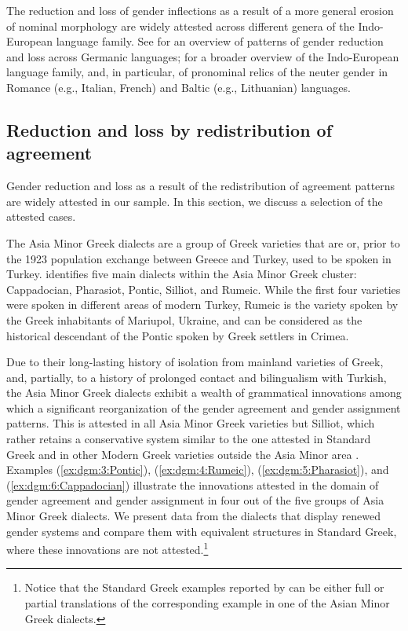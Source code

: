 \documentclass[output=collectionpaper]{langsci/langscibook}
\begin{document}
The reduction and loss of gender inflections as a result of a more general erosion of nominal morphology are widely attested across different genera of the Indo-European language family. See \citet[chapter 9]{Audring2009} for an overview of patterns of gender reduction and loss across Germanic languages; \citet{Priestly1983} for a broader overview of the Indo-European language family, and, in particular, of pronominal relics of the neuter gender in Romance (e.g., Italian, French) and Baltic (e.g., Lithuanian) languages.

\subsection{Reduction and loss by redistribution of agreement}
\label{subsubsec:semanticization}
Gender reduction and loss as a result of the redistribution of agreement patterns are widely attested in our sample. In this section, we discuss a selection of the attested cases.



The Asia Minor Greek dialects are a group of Greek varieties that are or, prior to the 1923 population exchange between Greece and Turkey, used to be spoken in Turkey. \citet{Karatsareas2014} identifies five main dialects within the Asia Minor Greek cluster:  Cappadocian, Pharasiot, Pontic, Silliot, and Rumeic. While the first four varieties were spoken in different areas of modern Turkey, Rumeic is the variety spoken by the Greek inhabitants of Mariupol, Ukraine, and can be considered as the historical descendant of the Pontic spoken by Greek settlers in Crimea.

Due to their long-lasting history of isolation from mainland varieties of Greek, and, partially, to a history of prolonged contact and bilingualism with Turkish, the Asia Minor Greek dialects exhibit a wealth of grammatical innovations among which a significant reorganization of the gender agreement and gender assignment patterns. This is attested in all Asia Minor Greek varieties but Silliot, which rather retains a conservative system similar to the one attested in Standard Greek and in other Modern Greek varieties outside the Asia Minor area \citep[83]{Karatsareas2014}. Examples (\ref{ex:dgm:3:Pontic}), (\ref{ex:dgm:4:Rumeic}), (\ref{ex:dgm:5:Pharasiot}), and (\ref{ex:dgm:6:Cappadocian}) illustrate the innovations attested in the domain of gender agreement and gender assignment in four out of the five groups of Asia Minor Greek dialects. We present data from the dialects that display renewed gender systems and compare them with equivalent structures in Standard Greek, where these innovations are not attested.\footnote{Notice that the Standard Greek examples reported by \citet{Karatsareas2014} can be either full or partial translations of the corresponding example in one of the Asian Minor Greek dialects.}
\end{document}
